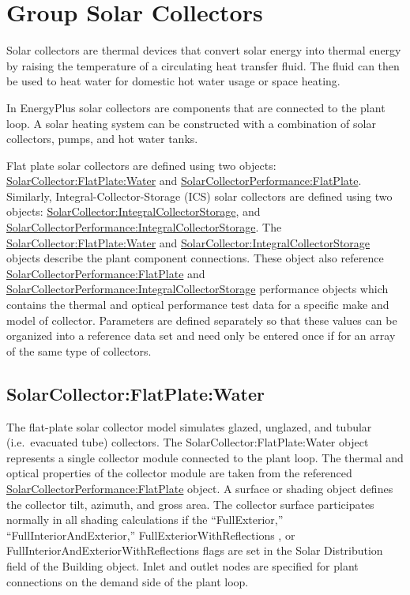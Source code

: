 \section{Group Solar Collectors}\label{group-solar-collectors}

Solar collectors are thermal devices that convert solar energy into thermal energy by raising the temperature of a circulating heat transfer fluid. The fluid can then be used to heat water for domestic hot water usage or space heating.

In EnergyPlus solar collectors are components that are connected to the plant loop. A solar heating system can be constructed with a combination of solar collectors, pumps, and hot water tanks.

Flat plate solar collectors are defined using two objects: \hyperref[solarcollectorflatplatewater]{SolarCollector:FlatPlate:Water} and \hyperref[solarcollectorperformanceflatplate]{SolarCollectorPerformance:FlatPlate}. Similarly, Integral-Collector-Storage (ICS) solar collectors are defined using two objects: \hyperref[solarcollectorintegralcollectorstorage]{SolarCollector:IntegralCollectorStorage}, and \hyperref[solarcollectorperformanceintegralcollectorstorage]{SolarCollectorPerformance:IntegralCollectorStorage}. The \hyperref[solarcollectorflatplatewater]{SolarCollector:FlatPlate:Water} and \hyperref[solarcollectorintegralcollectorstorage]{SolarCollector:IntegralCollectorStorage} objects describe the plant component connections. These object also reference \hyperref[solarcollectorperformanceflatplate]{SolarCollectorPerformance:FlatPlate} and \hyperref[solarcollectorperformanceintegralcollectorstorage]{SolarCollectorPerformance:IntegralCollectorStorage} performance objects which contains the thermal and optical performance test data for a specific make and model of collector. Parameters are defined separately so that these values can be organized into a reference data set and need only be entered once if for an array of the same type of collectors.

\subsection{SolarCollector:FlatPlate:Water}\label{solarcollectorflatplatewater}

The flat-plate solar collector model simulates glazed, unglazed, and tubular (i.e.~evacuated tube) collectors. The SolarCollector:FlatPlate:Water object represents a single collector module connected to the plant loop. The thermal and optical properties of the collector module are taken from the referenced \hyperref[solarcollectorperformanceflatplate]{SolarCollectorPerformance:FlatPlate} object. A surface or shading object defines the collector tilt, azimuth, and gross area. The collector surface participates normally in all shading calculations if the ``FullExterior,'' ``FullInteriorAndExterior,'' FullExteriorWithReflections , or FullInteriorAndExteriorWithReflections flags are set in the Solar Distribution field of the Building object. Inlet and outlet nodes are specified for plant connections on the demand side of the plant loop.

